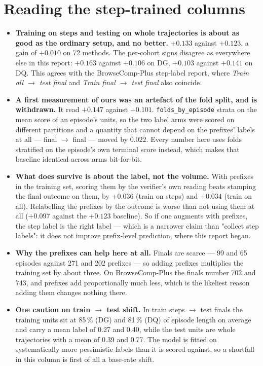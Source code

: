 \documentclass[10pt,a4paper]{article}
\begin{document}
\section*{Reading the step-trained columns}
\begin{itemize}\small
\item \textbf{Training on steps and testing on whole trajectories is about as good as the
ordinary setup, and no better.} $+0.133$ against $+0.123$, a gain of $+0.010$ on 72 methods. The
per-cohort signs disagree as everywhere else in this report: $+0.163$ against $+0.106$ on DG,
$+0.103$ against $+0.141$ on DQ. This agrees with the BrowseComp-Plus step-label report, where
\emph{Train all \ensuremath{\to} test final} and \emph{Train final \ensuremath{\to} test final}
also coincide.
\item \textbf{A first measurement of ours was an artefact of the fold split, and is withdrawn.}
It read $+0.147$ against $+0.101$. \texttt{folds\_by\_episode} strata on the mean score of an
episode's units, so the two label arms were scored on different partitions and a quantity that
cannot depend on the prefixes' labels at all --- final \ensuremath{\to} final --- moved by
$0.022$. Every number here uses folds stratified on the episode's own terminal score instead,
which makes that baseline identical across arms bit-for-bit.
\item \textbf{What does survive is about the label, not the volume.} With prefixes in the
training set, scoring them by the verifier's own reading beats stamping the final outcome on them,
by $+0.036$ (train on steps) and $+0.034$ (train on all). Relabelling the prefixes by the outcome
is worse than not using them at all ($+0.097$ against the $+0.123$ baseline). So if one augments
with prefixes, the step label is the right label --- which is a narrower claim than "collect step
labels": it does not improve prefix-level prediction, where this report began.
\item \textbf{Why the prefixes can help here at all.} Finals are scarce --- 99 and 65 episodes
against 271 and 202 prefixes --- so adding prefixes multiplies the training set by about three.
On BrowseComp-Plus the finals number 702 and 743, and prefixes add proportionally much less, which
is the likeliest reason adding them changes nothing there.
\item \textbf{One caution on train \ensuremath{\to} test shift.} In train steps
\ensuremath{\to} test finals the training units sit at 85\,\% (DG) and 81\,\% (DQ) of episode
length on average and carry a mean label of 0.27 and 0.40, while the test units are whole
trajectories with a mean of 0.39 and 0.77. The model is fitted on systematically more pessimistic
labels than it is scored against, so a shortfall in this column is first of all a base-rate shift.
\end{itemize}
\end{document}
